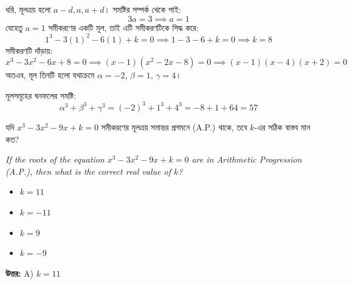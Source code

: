 \documentclass[12pt, a4paper]{article}
\begin{document}
\begin{tcolorbox}[solutionbox={সমাধান (Solution)}]
    \noindent
    ধরি, মূলত্রয় হলো $a-d, a, a+d$। সমষ্টির সম্পর্ক থেকে পাই:
    \[ 3a = 3 \implies a = 1 \]
    যেহেতু $a = 1$ সমীকরণের একটি মূল, তাই এটি সমীকরণটিকে সিদ্ধ করে:
    \[ 1^3 - 3(1)^2 - 6(1) + k = 0 \implies 1 - 3 - 6 + k = 0 \implies k = 8 \]
    সমীকরণটি দাঁড়ায়:
    \[ x^3 - 3x^2 - 6x + 8 = 0 \implies (x-1)(x^2 - 2x - 8) = 0 \implies (x-1)(x-4)(x+2) = 0 \]
    অতএব, মূল তিনটি হলো যথাক্রমে $\alpha = -2$, $\beta = 1$, $\gamma = 4$। 
    
    মূলসমূহের ঘনফলের সমষ্টি:
    \[ \alpha^3 + \beta^3 + \gamma^3 = (-2)^3 + 1^3 + 4^3 = -8 + 1 + 64 = 57 \]
\end{tcolorbox}
\begin{tcolorbox}[questionbox={প্রশ্ন (Question) 45}]
    \noindent
    যদি $x^3 - 3x^2 - 9x + k = 0$ সমীকরণের মূলত্রয় সমান্তর প্রগমনে (A.P.) থাকে, তবে $k$-এর সঠিক বাস্তব মান কত?
    
    \vspace{0.8em}
    \begin{english}
    \noindent\textit{\color{darkgray}
    If the roots of the equation $x^3 - 3x^2 - 9x + k = 0$ are in Arithmetic Progression (A.P.), then what is the correct real value of $k$?
    }
    \end{english}
\end{tcolorbox}

\begin{itemize}[label={}, leftmargin=1cm, itemsep=0.5em]
    \item[\textbf{A)}] $k = 11$
    \item[\textbf{B)}] $k = -11$
    \item[\textbf{C)}] $k = 9$
    \item[\textbf{D)}] $k = -9$
\end{itemize}

\vspace{0.5em}
\begin{tcolorbox}[answerbox]
    \textbf{\color{success} উত্তর:} A) $k = 11$
\end{tcolorbox}
\vspace{1em}
\end{document}
